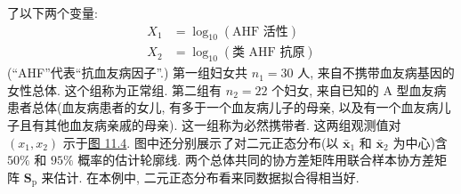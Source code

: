 
了以下两个变量:
\[
\begin{aligned}
X_1&=\log_{10}(\text{AHF 活性})\\
X_2&=\log_{10}(\text{类 AHF 抗原})
\end{aligned}
\]
(“AHF”代表“抗血友病因子”.) 第一组妇女共 $n_1=30$ 人, 来自不携带血友病基因的女性总体. 这个组称为正常组. 第二组有 $n_2=22$ 个妇女, 来自已知的 A 型血友病患者总体(血友病患者的女儿, 有多于一个血友病儿子的母亲, 以及有一个血友病儿子且有其他血友病亲戚的母亲). 这一组称为必然携带者. 这两组观测值对 $(x_1,x_2)$ 示于\hyperref[fig:11.4]{图 11.4}. 图中还分别展示了对二元正态分布(以 $\bar{\mathbf{x}}_1$ 和 $\bar{\mathbf{x}}_2$ 为中心)含 $50\%$ 和 $95\%$ 概率的估计轮廓线. 两个总体共同的协方差矩阵用联合样本协方差矩阵 $\mathbf{S}_{\mathrm{p}}$ 来估计. 在本例中, 二元正态分布看来同数据拟合得相当好.

\begin{mvfigure}
\label{fig:11.4}
\end{mvfigure}

